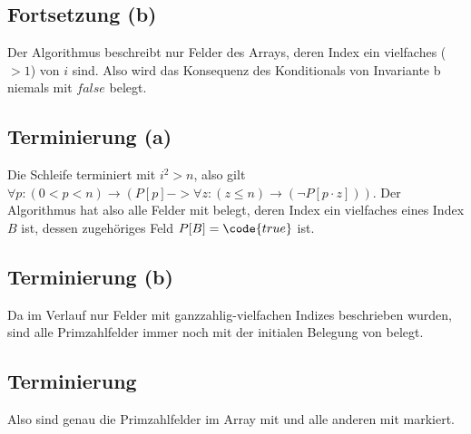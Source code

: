 \documentclass[parskip=half,a4paper]{scrartcl}
\begin{document}
\subsection*{Fortsetzung (b)}

Der Algorithmus beschreibt nur Felder des Arrays, deren Index ein vielfaches ($>1$) von $i$ sind. Also wird das Konsequenz des Konditionals von Invariante b niemals mit $false$ belegt.

\subsection*{Terminierung (a)}

Die Schleife terminiert mit $i^2 > n$, also gilt $\forall p:( 0 < p < n) \rightarrow (P[p] -> \forall z: (z \le n) \rightarrow (\neg P[p \cdot z]))$. Der Algorithmus hat also alle Felder mit  belegt, deren Index ein vielfaches eines Index $B$ ist, dessen zugehöriges Feld $P[B] = \code{true}$ ist.

\subsection*{Terminierung (b)}

Da im Verlauf nur Felder mit ganzzahlig-vielfachen Indizes beschrieben wurden, sind alle Primzahlfelder immer noch mit der initialen Belegung von 
belegt.

\subsection*{Terminierung}

Also sind genau die Primzahlfelder im Array mit  und alle anderen mit
 markiert.
\end{document}

